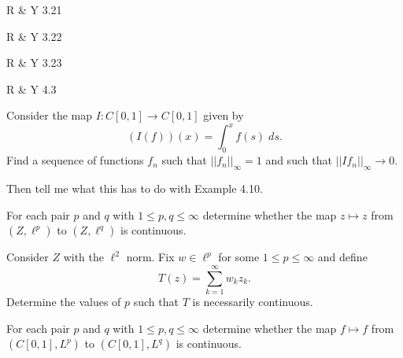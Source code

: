 \documentclass[minion]{homework}
\begin{document}
\begin{aproblems}



\hproblem R \& Y 3.21

\hproblem R \& Y 3.22

\hproblem R \& Y 3.23

\hproblem R \& Y 4.3

\hproblem Consider the map $I:C[0,1]\to C[0,1]$ given by
\[
(I(f))(x) = \int_0^x f(s)\; ds.
\]
Find a sequence of functions $f_n$ such that $||f_n||_{\infty}=1$
and such that $||If_n||_{\infty}\to 0$.  

Then tell me what this has to do with Example 4.10.

\hproblem For each pair $p$ and $q$ with $1\le p,q\le \infty$
determine whether the map $z\mapsto z$ from $(Z,\ell^p)$
to $(Z,\ell^q)$ is continuous.

\hproblem Consider $Z$ with the $\ell^2$ norm.  Fix $w\in \ell^p$
for some $1\le p\le \infty$ and define
\[
T(z) = \sum_{k=1}^\infty w_k z_k.
\]
Determine the values of $p$ such that $T$ is necessarily continuous.

 For each pair $p$ and $q$ with $1\le p,q\le \infty$
determine whether the map $f\mapsto f$ from $(C[0,1],L^p)$
to $(C[0,1],L^q)$ is continuous.

\end{aproblems}
\end{document}
